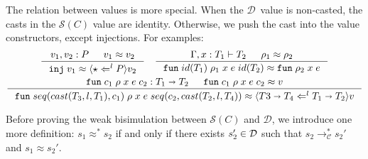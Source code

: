 \documentclass[acmsmall,review,anonymous]{acmart}\settopmatter{printfolios=true,printccs=false,printacmref=false}
\newcommand{\TOOdyn}[0]{\star}
\newcommand{\POOfun}[2]{#1 \shortrightarrow #2}
\newcommand{\cOOcast}[3]{#3 \Leftarrow^{#2} #1}
\newcommand{\vOOcast}[2]{\langle#2\rangle#1}
\newcommand{\vOOfun}[3]{\mathtt{fun} \; #1 \; #2 \; #3}
\newcommand{\hcvOOinj}[2]{\mathtt{inj} \; #2}
\newcommand{\hcvOOfun}[5]{\mathtt{fun} \; #1 \; #2 \; #3 \; #4 \; #5}
\newcommand{\hcvOOcons}[4]{\mathtt{cons}\;#1\;#2\;#3\;#4}
\newcommand{\judgeCreduceTrans}[2]{#1 \longrightarrow_{\mathcal{C}}^{*} #2}
\newcommand{\ineffCEKD}{$ \mathcal{D} $}
\newcommand{\effCEK}[1]{$ \mathcal{S}(#1) $}
\begin{document}
The relation between values is more special. When the \ineffCEKD\ value is 
non-casted, the casts in the \effCEK{C} value are identity. Otherwise, we push 
the cast into the value constructors, except injections. For examples: 
\begin{gather*}
\inference{
	v_1, v_2 : P &
	v_1 \approx v_2
}{
	\hcvOOinj{P_1}{v_1} \approx \vOOcast{v_2}{\cOOcast{P}{l}{\TOOdyn}}
}
\quad
\inference{
	\Gamma , x : T_1 \vdash T_2 &
	\rho_1 \approx \rho_2
}{
	\hcvOOfun{id(T_1)}{\rho_1}{x}{e}{id(T_2)} \approx \vOOfun{\rho_2}{x}{e}
}
\\
\inference{
	\hcvOOfun{c_1}{\rho}{x}{e}{c_2} : \POOfun{T_1}{T_2} &
	\hcvOOfun{c_1}{\rho}{x}{e}{c_2} \approx v
}{
	\hcvOOfun{seq(cast(T_3,l,T_1), c_1)}{\rho}{x}{e}{seq(c_2,cast(T_2,l,T_4))}
	\approx
	\vOOcast{v}{\cOOcast{\POOfun{T_1}{T_2}}{l}{\POOfun{T3}{T_4}}}
}
\end{gather*}

Before proving the weak bisimulation between \effCEK{C} and \ineffCEKD, we 
introduce one more definition: $ s_1 \approx^{*} s_2 $ if and only if there 
exists $ s_2' \in \text{\ineffCEKD} $ 
such that $ \judgeCreduceTrans{s_2}{s_2'}$ and $ s_1 \approx s_2' $.
\end{document}
